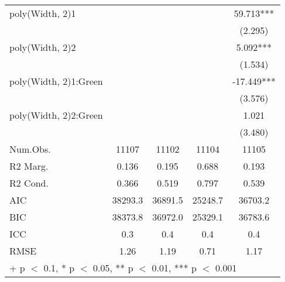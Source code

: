 \begin{table}
\begin{tabular}[t]{lcccc}
poly(Width, 2)1 &  &  &  & 59.713***\\
 &  &  &  & (2.295)\\
poly(Width, 2)2 &  &  &  & 5.092***\\
 &  &  &  & (1.534)\\
poly(Width, 2)1:Green &  &  &  & -17.449***\\
 &  &  &  & (3.576)\\
poly(Width, 2)2:Green &  &  &  & 1.021\\
 &  &  &  & (3.480)\\
\midrule
Num.Obs. & 11107 & 11102 & 11104 & 11105\\
R2 Marg. & 0.136 & 0.195 & 0.688 & 0.193\\
R2 Cond. & 0.366 & 0.519 & 0.797 & 0.539\\
AIC & 38293.3 & 36891.5 & 25248.7 & 36703.2\\
BIC & 38373.8 & 36972.0 & 25329.1 & 36783.6\\
ICC & 0.3 & 0.4 & 0.4 & 0.4\\
RMSE & 1.26 & 1.19 & 0.71 & 1.17\\
\bottomrule
\multicolumn{5}{l}{\rule{0pt}{1em}+ p $<$ 0.1, * p $<$ 0.05, ** p $<$ 0.01, *** p $<$ 0.001}\\
\end{tabular}
\end{table}
